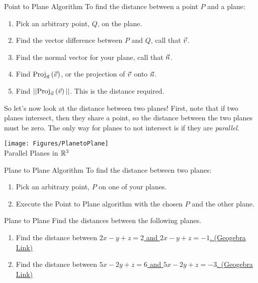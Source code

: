 \begin{claim}{Point to Plane Algorithm}
To find the distance between a point $P$ and a plane:
\vspace{1em}
\begin{enumerate}
\item Pick an arbitrary point, $Q$, on the plane.
\vspace{1em}
\item Find the vector difference between $P$ and $Q$, call that $\vec{v}$.
\vspace{1em}
\item Find the normal vector for your plane, call that $\vec{n}$.
\vspace{1em}
\item Find $\mathrm{Proj}_{\vec{n}}\left({\vec{v}}\right)$, or the projection of $\vec{v}$ onto $\vec{n}$.
\vspace{1em}
\item Find $||\mathrm{Proj}_{\vec{n}}\left({\vec{v}}\right)|| $. This is the distance required.
\end{enumerate}
\end{claim}

So let's now look at the distance between two planes! First, note that if two planes intersect, then they share a point, so the distance between the two planes must be zero. The only way for planes to not intersect is if they are \textit{parallel}. 

\begin{center}
    \texttt{[image: Figures/PlanetoPlane]}\\
    Parallel Planes in $\mathbb{R}^3$
\end{center}

\begin{claim}{Plane to Plane Algorithm}
To find the distance between two planes:
\vspace{1em}
\begin{enumerate}
\item Pick an arbitrary point, $P$ on one of your planes.
\vspace{1em}
\item Execute the Point to Plane algorithm with the chosen $P$ and the other plane.
\end{enumerate}
\end{claim}

\begin{exercise}{Plane to Plane}
Find the distances between the following planes.
\vspace{1em}
\begin{enumerate}
\item Find the distance between \href{https://www.geogebra.org/3d/gn8etvbp}{$2x-y+z=2$ and $2x-y+z=-1$. (Geogebra Link)}
\vspace{1em}
\item Find the distance between \href{https://www.geogebra.org/3d/ekksyyew}{$5x-2y+z=6$ and $5x-2y+z=-3$. (Geogebra Link)}
\end{enumerate}
\end{exercise}

